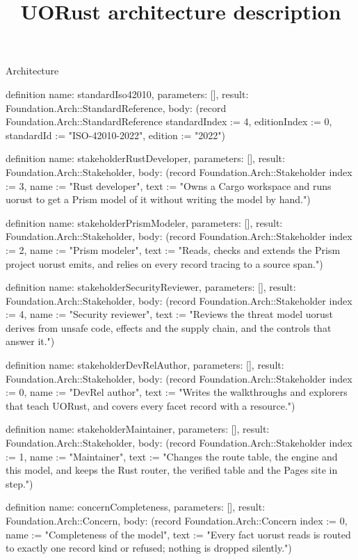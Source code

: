 \begin{lexlean}{Architecture}
\title{UORust architecture description}
\begin{semanticmodule}
definition{
  name: standardIso42010,
  parameters: [],
  result: Foundation.Arch::StandardReference,
  body: (record Foundation.Arch::StandardReference {standardIndex := 4, editionIndex := 0, standardId := "ISO-42010-2022", edition := "2022"})
}

definition{
  name: stakeholderRustDeveloper,
  parameters: [],
  result: Foundation.Arch::Stakeholder,
  body: (record Foundation.Arch::Stakeholder {index := 3, name := "Rust developer", text := "Owns a Cargo workspace and runs uorust to get a Prism model of it without writing the model by hand."})
}

definition{
  name: stakeholderPrismModeler,
  parameters: [],
  result: Foundation.Arch::Stakeholder,
  body: (record Foundation.Arch::Stakeholder {index := 2, name := "Prism modeler", text := "Reads, checks and extends the Prism project uorust emits, and relies on every record tracing to a source span."})
}

definition{
  name: stakeholderSecurityReviewer,
  parameters: [],
  result: Foundation.Arch::Stakeholder,
  body: (record Foundation.Arch::Stakeholder {index := 4, name := "Security reviewer", text := "Reviews the threat model uorust derives from unsafe code, effects and the supply chain, and the controls that answer it."})
}

definition{
  name: stakeholderDevRelAuthor,
  parameters: [],
  result: Foundation.Arch::Stakeholder,
  body: (record Foundation.Arch::Stakeholder {index := 0, name := "DevRel author", text := "Writes the walkthroughs and explorers that teach UORust, and covers every facet record with a resource."})
}

definition{
  name: stakeholderMaintainer,
  parameters: [],
  result: Foundation.Arch::Stakeholder,
  body: (record Foundation.Arch::Stakeholder {index := 1, name := "Maintainer", text := "Changes the route table, the engine and this model, and keeps the Rust router, the verified table and the Pages site in step."})
}

definition{
  name: concernCompleteness,
  parameters: [],
  result: Foundation.Arch::Concern,
  body: (record Foundation.Arch::Concern {index := 0, name := "Completeness of the model", text := "Every fact uorust reads is routed to exactly one record kind or refused; nothing is dropped silently."})
}


\end{semanticmodule}
\end{lexlean}
